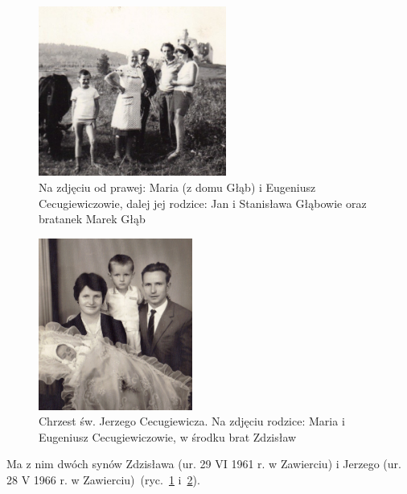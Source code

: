 \begin{figure}[!h]
\begin{center}
\includegraphics[width=0.55\textwidth]{zdjecia/maria_eugeniusz_cecugiewicz_z_rodzicami.jpg}
\caption[Maria i Eugeniusz Cecugiewiczowie z rodzicami]{Na zdjęciu od prawej: Maria (z domu Głąb) i Eugeniusz Cecugiewiczowie, dalej jej rodzice: Jan i Stanisława Głąbowie oraz bratanek Marek Głąb}
\label{rys:maria_eugeniusz_cecugiewicz_z_rodzicami}
\end{center}
\end{figure}

\begin{figure}[!h]
\begin{center}
\includegraphics[width=0.45\textwidth]{zdjecia/chrzest_jerzego_cecugiewicza.jpg}
\caption[Chrzest św. Jerzego Cecugiewicza]{Chrzest św. Jerzego Cecugiewicza. Na zdjęciu rodzice: Maria i Eugeniusz Cecugiewiczowie, w środku brat Zdzisław}
\label{rys:chrzest_jerzego_cecugiewicza}
\end{center}
\end{figure}

Ma z nim dwóch synów Zdzisława (ur. 29 VI 1961 r. w Zawierciu) i Jerzego (ur. 28 V 1966 r. w Zawierciu)~(ryc.~\ref{rys:maria_eugeniusz_cecugiewicz_z_rodzicami} i~\ref{rys:chrzest_jerzego_cecugiewicza}).


